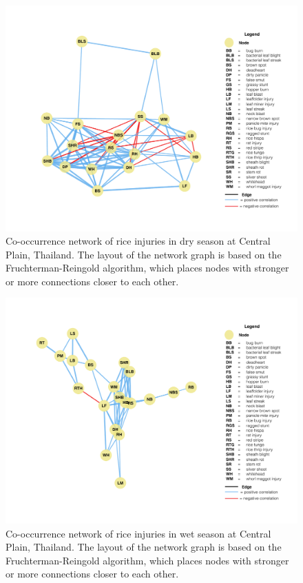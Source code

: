 \begin{figure}
    \centering
        \includegraphics[width = 1\textwidth]{figures/fullnetwork_CPds.pdf}
        \caption{Co-occurrence network of rice injuries in dry season at Central Plain, Thailand. The layout of the network graph is based on the Fruchterman-Reingold algorithm, which places nodes with stronger or more connections closer to each other.}
        \label{fig:fullnetwork_CPds}
    \end{figure}

\begin{figure}
    \centering
        \includegraphics[width = 1\textwidth]{figures/fullnetwork_CPws.pdf}
        \caption{Co-occurrence network of rice injuries in wet season at Central Plain, Thailand. The layout of the network graph is based on the Fruchterman-Reingold algorithm, which places nodes with stronger or more connections closer to each other.}
        \label{fig:fullnetwork_CPws}
    \end{figure}

